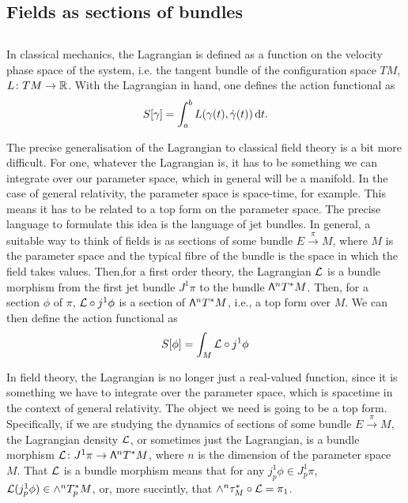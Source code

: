\documentclass[../main.tex]{subfiles}
\begin{document}
\subsection{Fields as sections of bundles}

\subsection{}



In classical mechanics, the Lagrangian is defined as a function on the velocity phase
space of the system, i.e. the tangent bundle of the configuration space \( TM \), \( L
\colon TM \to \mathbb{R} \). With the Lagrangian in hand, one defines the action functional as
\begin{equation*}
	S[\gamma] = \int_a^b L(\gamma(t), \dot{\gamma}(t)) \,\mathrm{d} t. 
\end{equation*}

The precise generalisation of the Lagrangian to classical field theory is a bit more
difficult. For one, whatever the Lagrangian is, it has to be something we can integrate
over our parameter space, which in general will be a manifold. In the case of general
relativity, the parameter space is space-time, for example. This  means it has to be
related to a top form on the parameter space. The precise language to formulate this idea
is the language of jet bundles. In general, a suitable way to think of fields is as
sections of some bundle \( E \xrightarrow{\pi} M \), where \( M \) is the parameter space
and the typical fibre of the bundle is the space in which the field takes values. Then,for
a first order theory, the Lagrangian \( \mathcal{L} \) is a bundle morphism from the first jet bundle \(
J^1\pi \) to the bundle \( \mathsf{\Lambda}^n T^\ast M \). Then, for a section \( \phi \) of \( \pi
\), \( \mathcal{L} \circ j^1 \phi \) is a section of \( \mathsf{\Lambda}^n T^\ast M \), i.e., a top form over
\( M \). We can then define the action functional as
\begin{equation*}
	S[\phi] = \int_M \mathcal{L} \circ j^1 \phi
\end{equation*}



In field theory, the Lagrangian is no longer just a real-valued function, since it is
something we have to integrate over the parameter space, which is spacetime in the context
of general relativity. The object we need is going to be a top form. Specifically, if we
are studying the dynamics of sections of some bundle \( E \xrightarrow{\pi} M \), the
Lagrangian density \( \mathcal{L} \), or sometimes just the Lagrangian, is a bundle morphism \( \mathcal{L}
\colon J^1\pi \to \mathsf{\Lambda}^n T^\ast M \), where \( n \) is the dimension of the parameter
space \( M \). That \( \mathcal{L} \) is a bundle morphism means that for any \( j_p^1 \phi \in
J^1_p \pi \), \( \mathcal{L}(j_p^1 \phi) \in \wedge^n T^\ast_p M \), or, more succintly, that \(
\wedge^n \tau_M^\ast \circ \mathcal{L} = \pi_1 \). 
\end{document}
